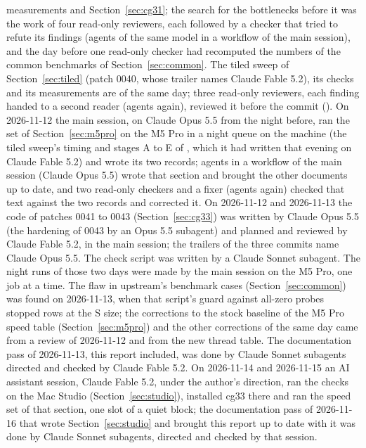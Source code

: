 measurements and Section~\ref{sec:cg31}; the search for the bottlenecks before it was the work of four read-only
reviewers, each followed by a checker that tried to refute its findings (agents of the same model in a workflow of
the main session), and the day before one read-only checker had recomputed the numbers of the common benchmarks of
Section~\ref{sec:common}. The tiled sweep of Section~\ref{sec:tiled} (patch 0040, whose trailer names Claude
Fable 5.2), its checks and its measurements are of the same day; three read-only reviewers, each finding handed to
a second reader (agents again), reviewed it before the commit ().
On 2026-11-12 the main session, on Claude Opus 5.5 from the night before, ran the set of Section~\ref{sec:m5pro}
on the M5 Pro in a night queue on the machine (the tiled sweep's timing and stages A to E of ,
which it had written that evening on Claude Fable 5.2) and wrote its two records; agents in a workflow of the main
session (Claude Opus 5.5) wrote that section and brought the other documents
up to date, and two read-only checkers and a fixer (agents again) checked that text against the two records and
corrected it.
On 2026-11-12 and 2026-11-13 the code of patches 0041 to 0043 (Section~\ref{sec:cg33}) was written by Claude Opus 5.5 (the
hardening of 0043 by an Opus 5.5 subagent) and planned and reviewed by Claude Fable 5.2, in the main session; the trailers of
the three commits name Claude Opus 5.5. The check script  was written by a Claude Sonnet subagent. The
night runs of those two days were made by the main session on the M5 Pro, one job at a time. The flaw in upstream's benchmark
cases (Section~\ref{sec:common}) was found on 2026-11-13, when that script's guard against all-zero probes stopped rows at the
S size; the corrections to the stock baseline of the M5 Pro speed table (Section~\ref{sec:m5pro}) and the other corrections of
the same day came from a review of 2026-11-12 and from the new thread table. The documentation pass of 2026-11-13, this
report included, was done by Claude Sonnet subagents directed and checked by Claude Fable 5.2.
On 2026-11-14 and 2026-11-15 an AI assistant session, Claude Fable 5.2, under the author's direction, ran the checks on the
Mac Studio (Section~\ref{sec:studio}), installed cg33 there and ran the speed set of that section, one slot of a quiet block; the
documentation pass of 2026-11-16 that wrote Section~\ref{sec:studio} and brought this report up to date with it was done by
Claude Sonnet subagents, directed and checked by that session.
